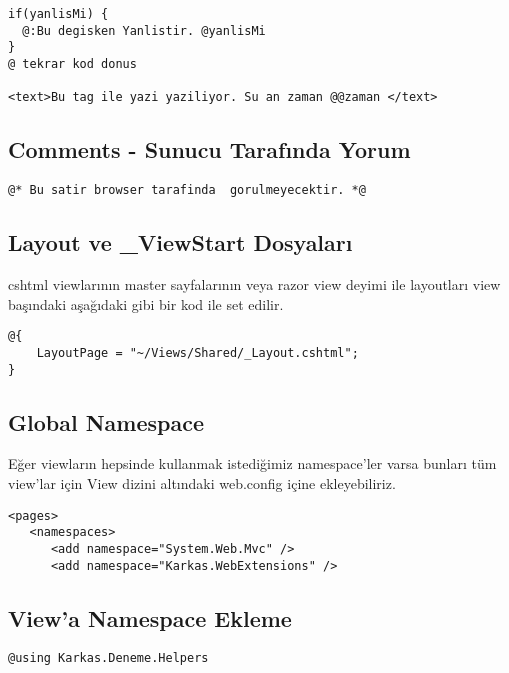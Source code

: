 \documentclass[10pt,a4paper]{article}
\begin{document}
\begin{lstlisting}[label=code-TextAndMarkup,caption=Yazı ve Markup]
if(yanlisMi) {
  @:Bu degisken Yanlistir. @yanlisMi
}
@ tekrar kod donus

<text>Bu tag ile yazi yaziliyor. Su an zaman @@zaman </text>
\end{lstlisting}


\subsection{Comments - Sunucu Tarafında Yorum}

\begin{lstlisting}[label=code-Comment,caption=Comment - Yorum]
@* Bu satir browser tarafinda  gorulmeyecektir. *@
\end{lstlisting}


\subsection{Layout ve \_ViewStart Dosyaları}
cshtml viewlarının master sayfalarının veya razor view deyimi ile layoutları
view başındaki aşağıdaki gibi bir kod ile set edilir.

\begin{lstlisting}[label=code-Layout,caption=Layout - Düzenleme]
@{
	LayoutPage = "~/Views/Shared/_Layout.cshtml";
}
\end{lstlisting}




\subsection{Global Namespace}
Eğer viewların hepsinde kullanmak istediğimiz namespace'ler varsa bunları tüm view'lar için View dizini altındaki web.config
içine ekleyebiliriz.

\begin{lstlisting}[label=code-GlobalNamespace,caption=Global Namespace Ekleme]
<pages>
   <namespaces>
      <add namespace="System.Web.Mvc" />
      <add namespace="Karkas.WebExtensions" />
\end{lstlisting}


\subsection{View'a Namespace Ekleme}
\begin{lstlisting}[label=code-ViewNamespace,caption=View Namespace Ekleme]
@using Karkas.Deneme.Helpers
\end{lstlisting}
\end{document}
